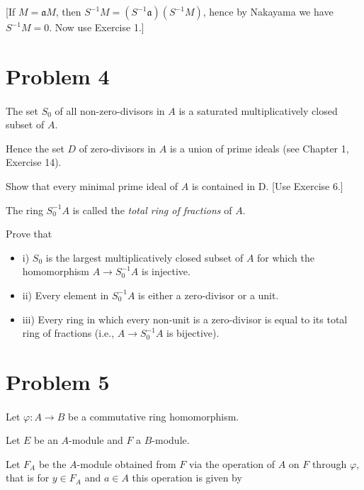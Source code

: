 \documentclass{article}
\begin{document}
[If $M=\mathfrak{a} M$, then $S^{-1} M=\left(S^{-1} \mathfrak{a}\right)\left(S^{-1} M\right)$, hence by Nakayama we have $S^{-1} M=0$. Now use Exercise 1.]

\section*{Problem 4}\paragraph{}
The set $S_0$ of all non-zero-divisors in $A$ is a saturated multiplicatively closed subset of $A$.

Hence the set $D$ of zero-divisors in $A$ is a union of prime ideals (see Chapter 1, Exercise 14).

Show that every minimal prime ideal of $A$ is contained in D. [Use Exercise 6.]

The ring $S_0^{-1} A$ is called the \textit{total ring of fractions} of $A$.

Prove that

\begin{itemize}
    \item i) $S_0$ is the largest multiplicatively closed subset of $A$ for which the homomorphism $A \rightarrow S_0^{-1} A$ is injective.

    \item ii) Every element in $S_0^{-1} A$ is either a zero-divisor or a unit.

    \item iii) Every ring in which every non-unit is a zero-divisor is equal to its total ring of fractions (i.e., $A \rightarrow S_0^{-1} A$ is bijective).
\end{itemize}


\section*{Problem 5}\paragraph{}
Let $\varphi: A \rightarrow B$ be a commutative ring homomorphism.

Let $E$ be an $A$-module and $F$ a $B$-module.

Let $F_A$ be the $A$-module obtained from $F$ via the operation of $A$ on $F$ through $\varphi$, that is for $y \in F_A$ and $a \in A$ this operation is given by
\end{document}
